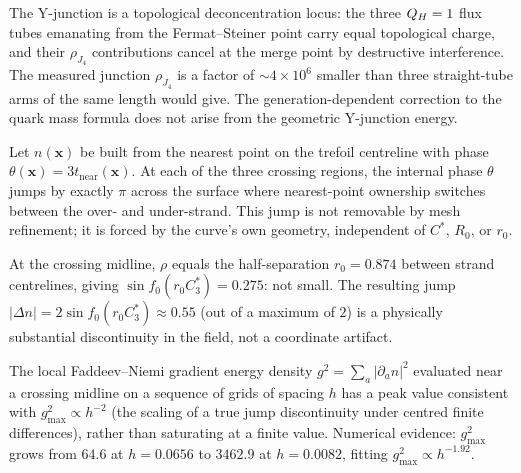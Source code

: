 \begin{remark}
\label{P16:rem:junction_results}
The Y-junction is a topological deconcentration locus: the three $Q_H=1$
flux tubes emanating from the Fermat--Steiner point carry equal topological
charge, and their $\rho_{J_4}$ contributions cancel at the merge point by
destructive interference. The measured junction $\rho_{J_4}$ is a factor
of $\sim4\times10^6$ smaller than three straight-tube arms of the same
length would give. The generation-dependent correction to the quark mass
formula does not arise from the geometric Y-junction energy.
\end{remark}

\begin{proposition}
\label{P16:prop:phase_jump}
Let $n(\mathbf{x})$ be built from the nearest point on the trefoil
centreline with phase $\theta(\mathbf{x})=3t_{\mathrm{near}}(\mathbf{x})$.
At each of the three crossing regions, the internal phase $\theta$ jumps
by exactly $\pi$ across the surface where nearest-point ownership switches
between the over- and under-strand. This jump is not removable by mesh
refinement; it is forced by the curve's own geometry, independent of
$C^*$, $R_0$, or $r_0$.
\end{proposition}

\begin{remark}
\label{P16:rem:not_a_pole}
At the crossing midline, $\rho$ equals the half-separation $r_0=0.874$
between strand centrelines, giving $\sin f_0(r_0 C_3^*)=0.275$: not
small. The resulting jump $|\Delta n|=2\sin f_0(r_0 C_3^*)\approx0.55$
(out of a maximum of $2$) is a physically substantial discontinuity in
the field, not a coordinate artifact.
\end{remark}

\begin{proposition}
\label{P16:prop:divergent_energy}
The local Faddeev--Niemi gradient energy density $g^2=\sum_a|\partial_a n|^2$
evaluated near a crossing midline on a sequence of grids of spacing $h$
has a peak value consistent with $g^2_{\max}\propto h^{-2}$ (the scaling
of a true jump discontinuity under centred finite differences), rather
than saturating at a finite value. Numerical evidence: $g^2_{\max}$
grows from $64.6$ at $h=0.0656$ to $3462.9$ at $h=0.0082$, fitting
$g^2_{\max}\propto h^{-1.92}$.
\end{proposition}

